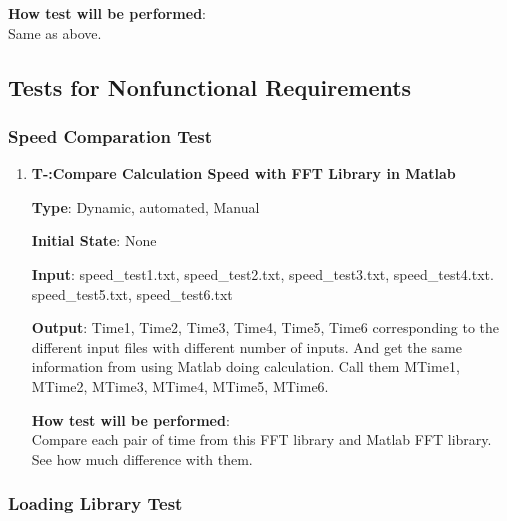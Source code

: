 \documentclass[12pt, titlepage]{article}
\newcounter{tnum}
\begin{document}
\begin{enumerate}
\textbf {How test will be performed}: \\
Same as above.


\end{enumerate}
\subsection{Tests for Nonfunctional Requirements}

\subsubsection{Speed Comparation Test}
\begin{enumerate}

\item{\textbf{T-\thetnum \label{R3RIFFT}:Compare Calculation Speed with FFT Library in Matlab}}

\textbf {Type}: Dynamic, automated, Manual
					
\textbf {Initial State}: None
					
\textbf {Input}: speed\_test1.txt, speed\_test2.txt, speed\_test3.txt, speed\_test4.txt.  speed\_test5.txt, speed\_test6.txt
					
\textbf {Output}: Time1, Time2, Time3, Time4,  Time5, Time6 corresponding to the different input files with different number of inputs.
And get the same information from using Matlab doing calculation. Call them  MTime1, MTime2, MTime3, MTime4,  MTime5, MTime6.
					
\textbf {How test will be performed}: \\
Compare each pair of time from this FFT library and Matlab FFT library.
See how much difference with them.

\end{enumerate}

\subsubsection{Loading Library Test}
\end{document}
